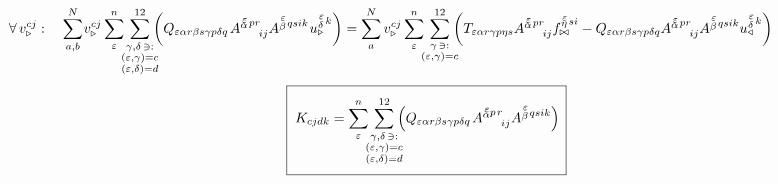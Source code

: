 \begin{equation}
   \hspace{-18mm}
   \forall \, v^{c j}_{\triangleright}: \quad
   \sum^N_{a,b} \mkern-2mu v^{c  j}_{\triangleright}
   \sum^n_\varepsilon
   \mkern-7mu
   \sum_{\substack{\gamma, \delta \, \ni: \\
      (\varepsilon,\gamma) = c \\ (\varepsilon,\delta) = d}}^{12}
   \mkern-10mu
   \qty(
   Q_{\varepsilon   \alpha r   \beta s   \gamma p   \delta q} \mkern2mu
   A^{\substack{\mkern2mu \varepsilon \\[-0.65mm] \alpha} \mkern2mu p r}_{\mkern29mu i j}
   A^{\substack{\mkern2mu \varepsilon \\[0.05mm] \beta} \mkern2mu q s i k} \mkern1mu
   u^{\substack{\mkern2mu \varepsilon \\[0.09mm] \delta} \mkern2mu k}_\triangleright )
   =
   \sum^N_a v^{c j}_{\triangleright}
   \sum^n_\varepsilon
   \mkern-7mu
   \sum_{\substack{\gamma \, \ni: \\ (\varepsilon,\gamma) = c}}^{12}
   \mkern-10mu
   \qty(
   T_{\varepsilon   \alpha r   \gamma p   \eta s}
   A^{\substack{\mkern2mu \varepsilon \\[-0.65mm] \alpha} \mkern2mu p r}_{\mkern29mu i j}
   f^{\substack{\mkern2mu \varepsilon \\[-0.59mm] \eta} \mkern2mu s i}_{\bowtie}
   -
   Q_{\varepsilon   \alpha r   \beta s   \gamma p   \delta q}
   A^{\substack{\mkern2mu \varepsilon \\[-0.65mm] \alpha} \mkern2mu p r}_{\mkern29mu i j}
   A^{\substack{\mkern2mu \varepsilon \\[0.05mm] \beta} \mkern2mu q s i k}
   u^{\substack{\mkern2mu \varepsilon \\[0.09mm] \delta} \mkern2mu k}_\triangleleft )
\end{equation}
\begin{equation}
   \boxed{ \phantom{\rule[-12mm]{1mm}{20mm}}
   K_{cjdk} =
   \sum^n_\varepsilon
   \mkern-7mu
   \sum_{\substack{\gamma, \delta \, \ni: \\
      (\varepsilon,\gamma) = c \\ (\varepsilon,\delta) = d}}^{12}
   \mkern-10mu
   \qty(
   Q_{\varepsilon   \alpha r   \beta s   \gamma p   \delta q} \mkern2mu
   A^{\substack{\mkern2mu \varepsilon \\[-0.65mm] \alpha} p \mkern2mu r}_{\mkern29mu i j}
   A^{\substack{\mkern2mu \varepsilon \\[0.05mm] \beta} \mkern2mu  q s i k} ) \mkern3mu }
\end{equation}
